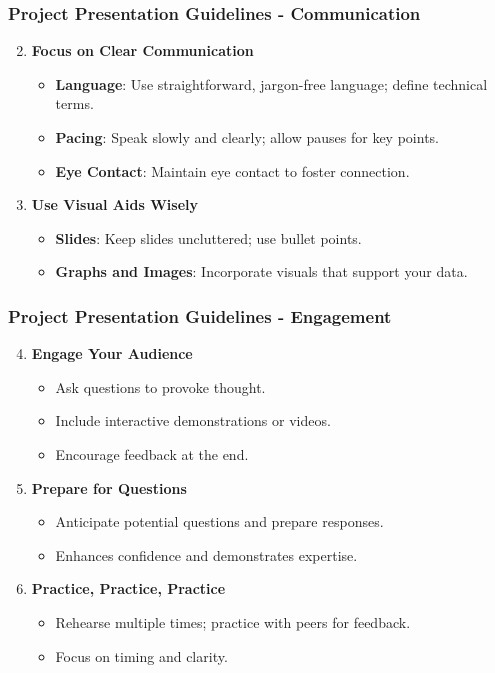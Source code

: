 \documentclass[aspectratio=169]{beamer}
\begin{document}
\begin{frame}[fragile]
    \frametitle{Project Presentation Guidelines - Communication}
    \begin{enumerate}
        \setcounter{enumi}{1}
        \item \textbf{Focus on Clear Communication}
        \begin{itemize}
            \item \textbf{Language}: Use straightforward, jargon-free language; define technical terms.
            \item \textbf{Pacing}: Speak slowly and clearly; allow pauses for key points.
            \item \textbf{Eye Contact}: Maintain eye contact to foster connection.
        \end{itemize}

        \item \textbf{Use Visual Aids Wisely}
        \begin{itemize}
            \item \textbf{Slides}: Keep slides uncluttered; use bullet points.
            \item \textbf{Graphs and Images}: Incorporate visuals that support your data.
        \end{itemize}
    \end{enumerate}
\end{frame}

\begin{frame}[fragile]
    \frametitle{Project Presentation Guidelines - Engagement}
    \begin{enumerate}
        \setcounter{enumi}{3}
        \item \textbf{Engage Your Audience}
        \begin{itemize}
            \item Ask questions to provoke thought.
            \item Include interactive demonstrations or videos.
            \item Encourage feedback at the end.
        \end{itemize}

        \item \textbf{Prepare for Questions}
        \begin{itemize}
            \item Anticipate potential questions and prepare responses.
            \item Enhances confidence and demonstrates expertise.
        \end{itemize}

        \item \textbf{Practice, Practice, Practice}
        \begin{itemize}
            \item Rehearse multiple times; practice with peers for feedback.
            \item Focus on timing and clarity.
        \end{itemize}
    \end{enumerate}
\end{frame}
\end{document}
